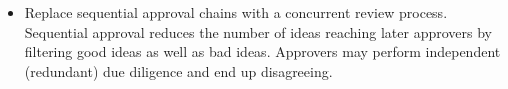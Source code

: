 \begin{itemize}
\item Replace sequential approval chains with a concurrent review process. Sequential approval reduces the number of ideas reaching later approvers by filtering good ideas as well as bad ideas. Approvers may perform independent (redundant) due diligence and end up disagreeing. 
\end{itemize}
